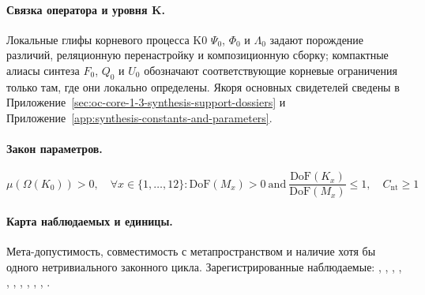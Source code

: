 \paragraph{Связка оператора и уровня K.}
Локальные глифы корневого процесса K0 \(\Psi_0\), \(\Phi_0\) и \(\Lambda_0\) задают порождение различий, реляционную перенастройку и композиционную сборку; компактные алиасы синтеза \(F_0\), \(Q_0\) и \(U_0\) обозначают соответствующие корневые ограничения только там, где они локально определены.
Якоря основных свидетелей сведены в Приложение~\ref{sec:oc-core-1-3-synthesis-support-dossiers} и Приложение~\ref{app:synthesis-constants-and-parameters}.

\paragraph{Закон параметров.}
\[
\mu(\Omega(K_0)) > 0,\quad \forall x \in \{1,\dots,12\}: \mathrm{DoF}(M_x)>0\ \mathrm{and}\ \frac{\mathrm{DoF}(K_x)}{\mathrm{DoF}(M_x)} \leq 1,\quad C_{\mathrm{nt}} \geq 1
\]

\paragraph{Карта наблюдаемых и единицы.}
Мета-допустимость, совместимость с метапространством и наличие хотя бы одного нетривиального законного цикла.
Зарегистрированные наблюдаемые: , \allowbreak {}, \allowbreak {}, \allowbreak {}, \allowbreak {}, \allowbreak {}, \allowbreak {}, \allowbreak {}, \allowbreak {}, \allowbreak {}, \allowbreak {}.


